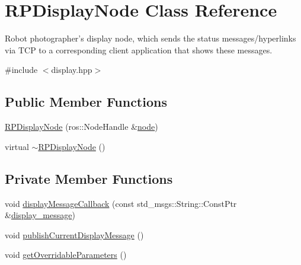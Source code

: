 \hypertarget{class_r_p_display_node}{\section{\-R\-P\-Display\-Node \-Class \-Reference}
\label{class_r_p_display_node}
}


\-Robot photographer's display node, which sends the status messages/hyperlinks via \-T\-C\-P to a corresponding client application that shows these messages.  




{\ttfamily \#include $<$display.\-hpp$>$}

\subsection*{\-Public \-Member \-Functions}
\begin{DoxyCompactItemize}
\item 
\hyperlink{class_r_p_display_node_ac1bac67cfb93e968bbf59f8bb3208f51}{\-R\-P\-Display\-Node} (ros\-::\-Node\-Handle \&\hyperlink{class_r_p_display_node_ad6d8ebb35b06877b8fffe1a99f556c13}{node})
\item 
virtual \hyperlink{class_r_p_display_node_a17fd386c9f75d9b7fab628159e8ec07e}{$\sim$\-R\-P\-Display\-Node} ()
\end{DoxyCompactItemize}
\subsection*{\-Private \-Member \-Functions}
\begin{DoxyCompactItemize}
\item 
void \hyperlink{class_r_p_display_node_aeb7d9993bbb57fdf4ed64e9184ba58dd}{display\-Message\-Callback} (const std\-\_\-msgs\-::\-String\-::\-Const\-Ptr \&\hyperlink{class_r_p_display_node_a67384dfa9a2bd68ef5e472fa3bec9d67}{display\-\_\-message})
\item 
void \hyperlink{class_r_p_display_node_ac745cf7a7a5c50451ab0ab4d5dac1f31}{publish\-Current\-Display\-Message} ()
\item 
void \hyperlink{class_r_p_display_node_a44117478f4d2c485fa5d6c4e2a9fe638}{get\-Overridable\-Parameters} ()
\end{DoxyCompactItemize}

